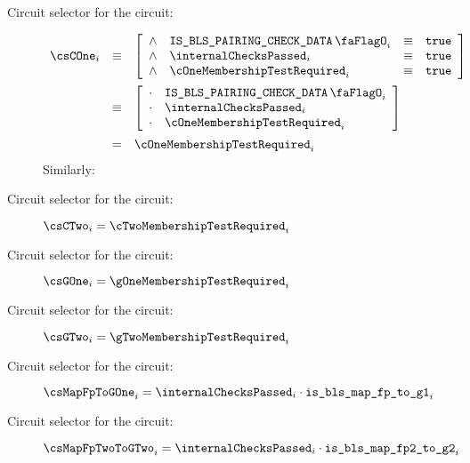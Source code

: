 \begin{description}
    
    \item[Circuit selector for the  circuit:]
        \[
            \begin{array}{lcl}
                \csCOne_{i} & \equiv &
                \left[ \begin{array}{clcr}
                    \wedge & \isBlsPairingCheckData_{i}        & \equiv & \texttt{true} \\
                    \wedge & \internalChecksPassed_{i}   & \equiv & \texttt{true} \\
                    \wedge & \cOneMembershipTestRequired_{i} & \equiv & \texttt{true} \\
                \end{array} \right] \vspace{2mm} \\
                & \equiv & 
                \left[ \begin{array}{clcr}
                    \cdot & \isBlsPairingCheckData_{i}        \\
                    \cdot & \internalChecksPassed_{i}   \\
                    \cdot & \cOneMembershipTestRequired_{i} \\
                \end{array} \right] \vspace{2mm} \\
                & =      & \cOneMembershipTestRequired_{i} \\
            \end{array}
        \]
    \noindent
    Similarly:
    \item[Circuit selector for the  circuit:]
        $\csCTwo_{i} = \cTwoMembershipTestRequired_{i}$
    \item[Circuit selector for the  circuit:]
        $\csGOne_{i} = \gOneMembershipTestRequired_{i}$
    \item[Circuit selector for the  circuit:]
        $\csGTwo_{i} = \gTwoMembershipTestRequired_{i}$
    \item[Circuit selector for the  circuit:]
        $\csMapFpToGOne_{i} = \internalChecksPassed_{i} \cdot \locIsBlsMapFpToGOne_{i}$
    \item[Circuit selector for the  circuit:]
        $\csMapFpTwoToGTwo_{i} = \internalChecksPassed_{i} \cdot \locIsBlsMapFpTwoToGTwo_{i}$
\end{description}    

